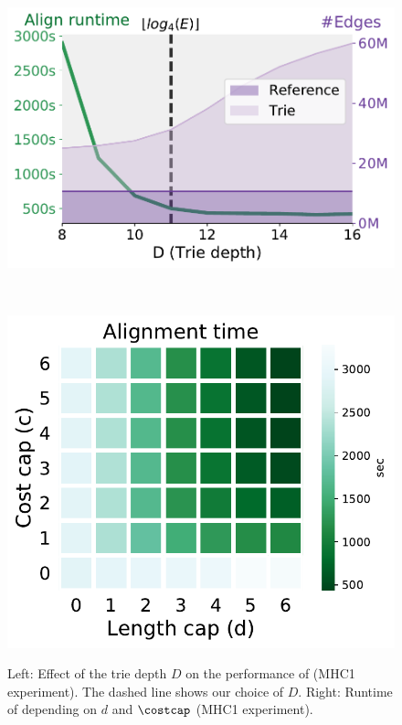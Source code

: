 \begin{figure}[b]
	\centering
	\begin{minipage}{0.48\linewidth}
		\centering
		\includegraphics[width=\linewidth]{figs/trie/MHC1-trie-vs-D.pdf}
		\caption[Performance depending on the trie depth; alignment time depending on prefix heuristic parameters]{Left: Effect of the trie depth $D$ on the performance of \astarix (MHC1 experiment). The dashed line shows our choice of $D$. Right: Runtime of \astarix depending on $d$ and $\costcap$ (MHC1 experiment).}
		\label{TRIEfig:trie_vs_D}
	\end{minipage}~\hspace{0.7em}
	\begin{minipage}{0.49\linewidth}
		\centering
		\includegraphics[width=0.8\linewidth]{figs/heuristic/MHC1-heatmap-c_vs_d-align_sec.pdf}
		\label{TRIEfig:heuristic-parameters}
	\end{minipage}
\end{figure}

